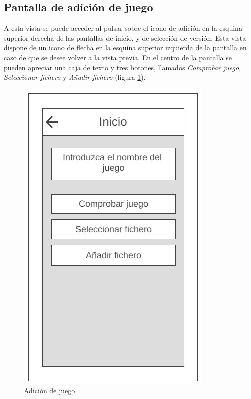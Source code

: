 \subsection{Pantalla de adición de juego}
A esta vista se puede acceder al pulsar sobre el icono de adición en la esquina superior derecha 
de las pantallas de inicio, y de selección de versión. Esta vista dispone de un icono de flecha en la esquina superior 
izquierda de la pantalla en caso de que se desee volver a la vista previa. En el centro de la pantalla se pueden apreciar 
una caja de texto y tres botones, llamados \textit{Comprobar juego}, \textit{Seleccionar fichero} y \textit{Añadir fichero} 
(figura \ref*{AnadirJuego}).
\newpage
\begin{figure}[H]
    \centering
    \includegraphics[scale=0.4]{Figures/Mockups/Mock_AnadirJuego.png}
    \caption{Adición de juego}
    \label{AnadirJuego}    
\end{figure}

